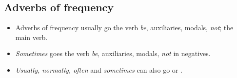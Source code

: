 \subsection{Adverbs of frequency}
\begin{itemize}
    \item Adverbs of frequency usually go
     the verb \textit{be}, auxiliaries, modals, \textit{not};  the main verb.
    \item[\ast] \textit{Sometimes} goes  the verb \textit{be}, auxiliaries, modals, \textit{not} in negatives.
    \item[\ast] \textit{Usually, normally, often} and \textit{sometimes}
    can also go  or .
\end{itemize}